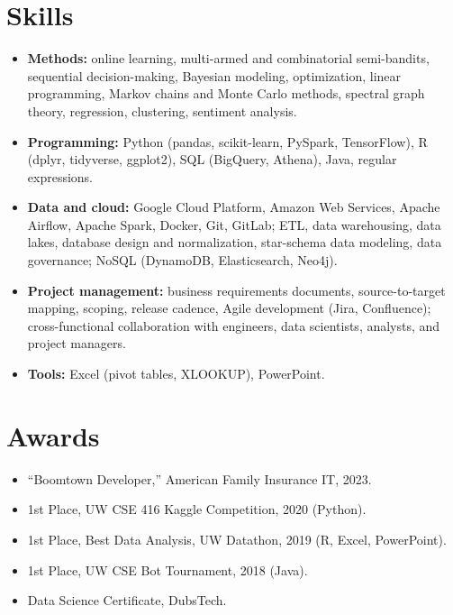 \documentclass[10pt,letterpaper]{article}
\begin{document}
\section*{Skills}

\begin{itemize}
  \item \textbf{Methods:} online learning, multi-armed and combinatorial
    semi-bandits, sequential decision-making, Bayesian modeling,
    optimization, linear programming, Markov chains and Monte Carlo methods,
    spectral graph theory, regression, clustering, sentiment analysis.
  \item \textbf{Programming:} Python (pandas, scikit-learn, PySpark,
    TensorFlow), R (dplyr, tidyverse, ggplot2), SQL (BigQuery, Athena), Java,
    regular expressions.
  \item \textbf{Data and cloud:} Google Cloud Platform, Amazon Web Services,
    Apache Airflow, Apache Spark, Docker, Git, GitLab; ETL, data warehousing,
    data lakes, database design and normalization, star-schema data
    modeling, data governance; NoSQL (DynamoDB, Elasticsearch, Neo4j).
  \item \textbf{Project management:} business requirements documents,
    source-to-target mapping, scoping, release cadence, Agile development
    (Jira, Confluence); cross-functional collaboration with engineers, data
    scientists, analysts, and project managers.
  \item \textbf{Tools:} Excel (pivot tables, XLOOKUP), PowerPoint.
\end{itemize}

\section*{Awards}

\begin{itemize}
  \item ``Boomtown Developer,'' American Family Insurance IT, 2023.
  \item 1st Place, UW CSE 416 Kaggle Competition, 2020 (Python).
  \item 1st Place, Best Data Analysis, UW Datathon, 2019 (R, Excel, PowerPoint).
  \item 1st Place, UW CSE Bot Tournament, 2018 (Java).
  \item Data Science Certificate, DubsTech.
\end{itemize}
\end{document}
